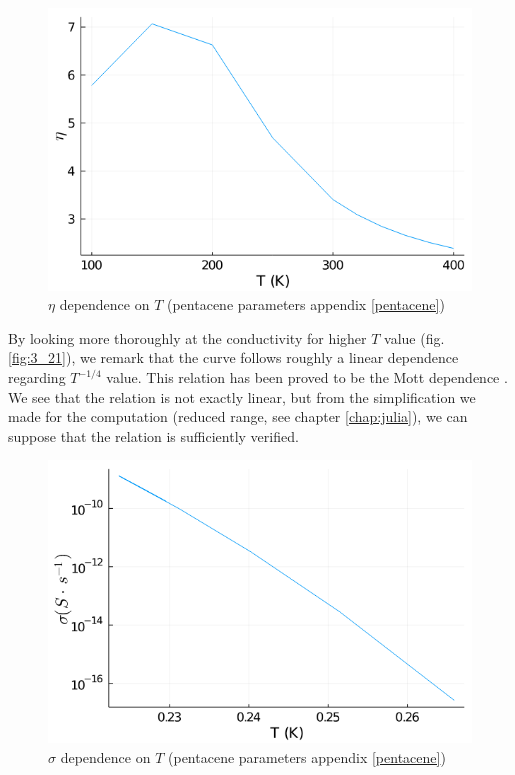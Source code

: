 \begin{figure}[!h]
    \centering
    \includegraphics*[width=.5\paperwidth]{figures/3_elec/ein_t.png}
    \caption{$\eta$ dependence on $T$ (pentacene parameters appendix \ref{pentacene})\label{fig:3_19}}
\end{figure}

By looking more thoroughly at the conductivity for higher $T$ value (fig. \ref{fig:3_21}), we remark that the curve follows roughly a linear dependence regarding $T^{-1/4}$ value. This relation has been proved to be the Mott dependence \cite{temperature_1}. We see that the relation is not exactly linear, but from the simplification we made for the computation (reduced range, see chapter \ref{chap:julia}), we can suppose that the relation is sufficiently verified.

\begin{figure}[!h]
    \centering
    \includegraphics*[width=.5\paperwidth]{figures/3_elec/sigma_t.png}
    \caption{$\sigma$ dependence on $T$ (pentacene parameters appendix \ref{pentacene})\label{fig:3_22}}
\end{figure}

